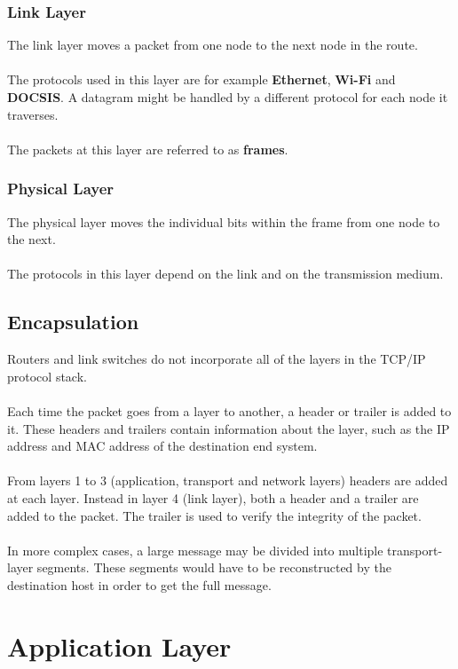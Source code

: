 \documentclass{article}
\begin{document}
\subsubsection{Link Layer}
The link layer moves a packet from one node to the next node in the route. \\ \\
The protocols used in this layer are for example \textbf{Ethernet}, \textbf{Wi-Fi} and \textbf{DOCSIS}. A datagram might be handled by a different protocol for each node it traverses. \\ \\
The packets at this layer are referred to as \textbf{frames}.

\subsubsection{Physical Layer}
The physical layer moves the individual bits within the frame from one node to the next. \\ \\
The protocols in this layer depend on the link and on the transmission medium.

\subsection{Encapsulation}
Routers and link switches do not incorporate all of the layers in the TCP/IP protocol stack. \\ \\
Each time the packet goes from a layer to another, a header or trailer is added to it. These headers and trailers contain information about the layer, such as the IP address and MAC address of the destination end system. \\ \\
From layers 1 to 3 (application, transport and network layers) headers are added at each layer. Instead in layer 4 (link layer), both a header and a trailer are added to the packet. The trailer is used to verify the integrity of the packet. \\ \\
In more complex cases, a large message may be divided into multiple transport-layer segments. These segments would have to be reconstructed by the destination host in order to get the full message.

\section{Application Layer}
\end{document}

